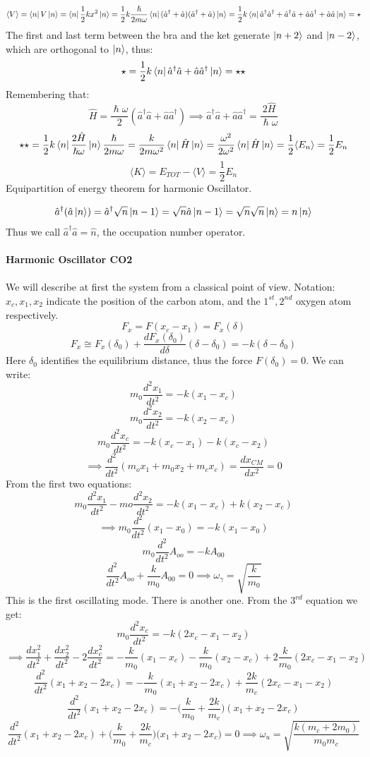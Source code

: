\documentclass{article}
\begin{document}
$$ \langle V \rangle = \bra{n}V \ket{n} = \bra{n}\frac{1}{2}kx^2 \ket{n} = \frac{1}{2} k \frac{\hslash}{2m\omega} \bra{n}(\hat{a}^{\dag} + \hat{a})(\hat{a}^{\dag}+\hat{a})\ket{n} = \frac{1}{2}k\bra{n}\hat{a}^{\dag}\hat{a}^{\dag}+ \hat{a}^{\dag}\hat{a}+\hat{a}\hat{a}^{\dag}
+\hat{a}\hat{a}\ket{n} = \star $$ 
The first and last term between the bra and the ket generate $\ket{n+2}$ and $\ket{n-2}$, which are orthogonal to $\ket{n}$, thus:
$$\star = \frac{1}{2}k\bra{n}\hat{a}^{\dag}\hat{a}+\hat{a}\hat{a}^{\dag} \ket{n} = \star \star$$
Remembering that:
$$\hat{H} = \frac{\hslash\omega}{2}(\hat{a}^{\dag}\hat{a}+\hat{a}\hat{a}^{\dag}) \implies \hat{a}^{\dag}\hat{a}+\hat{a}\hat{a}^{\dag} = \frac{2\hat{H}}{\hslash\omega} $$
$$ \star \star = \frac{1}{2} k \bra{n}\frac{2\hat{H}}{\hslash\omega}\ket{n}\frac{\hslash}{2m\omega}=\frac{k}{2m\omega^2}\bra{n}\hat{H}\ket{n}=\frac{\omega^2}{2\omega^2}\bra{n}\hat{H}\ket{n}=\frac{1}{2}\langle E_n \rangle = \frac{1}{2}E_n$$
$$\langle K \rangle = E_{TOT} -\langle V \rangle = \frac{1}{2} E_n$$
Equipartition of energy theorem for harmonic Oscillator.

$$ \hat{a}^{\dag}(\hat{a} \ket{n}) = \hat{a}^{\dag}\sqrt{n}\ket{n-1} =\sqrt{n}\hat{a}\ket{n-1}= \sqrt{n}\sqrt{n}\ket{n} = n \ket{n}$$
Thus we call $\hat{a}^{\dag}\hat{a} = \hat{n}$, the occupation  number operator.\\  \\ 
\textbf{Harmonic Oscillator CO2 }\\ \\
We will describe at first the system from a classical point of view.
Notation:$ x_c,x_1,x_2 $ indicate the position of the carbon atom, and the $ 1^{st},2^{nd} $ oxygen atom respectively.
$$F_x = F(x_c-x_1) = F_x(\delta)$$
$$F_x  \cong F_x(\delta_0)+ \frac{dF_x(\delta_0)}{d\delta}(\delta-\delta_0) = -k (\delta-\delta_0)$$
Here $\delta_0$ identifies the equilibrium distance, thus the force $F(\delta_0) = 0.$
We can write:
$$m_0 \frac{d^2x_1}{dt^2} = -k(x_1-x_c)$$
$$m_0 \frac{d^2x_2}{dt^2} = -k(x_2-x_c)$$
$$m_0 \frac{d^2x_c}{dt^2} = -k(x_c-x_1)-k(x_c-x_2)$$
$$\implies\frac{d^2}{dt^2} (m_o x_1+m_0x_2+m_c x_c) = \frac{dx_{CM}}{dx^2} = 0$$
From the first two equations:
$$m_0 \frac{d^2x_1}{dt^2}-mo \frac{d^2x_2}{dt^2} = -k(x_1-x_c)+k(x_2-x_c)$$
$$\implies m_0 \frac{d^2}{dt^2}(x_1-x_0) = -k(x_1-x_0)$$
$$ m_0 \frac{d^2}{dt^2}A_{oo} = -kA_{00}$$
$$ \frac{d^2}{dt^2}A_{oo} +\frac{k}{m_0}A_{00}=0 \implies \omega_\gamma = \sqrt{\frac{k}{m_0}}$$
This is the first oscillating mode. There is another one. From the $3^{rd}$ equation we get:
$$m_0 \frac{d^2x_c}{dt^2} = -k(2x_c-x_1-x_2)$$
$$\implies \frac{dx_1^2}{dt^2}+\frac{dx_2^2}{dt^2}-2\frac{dx_c^2}{dt^2} = -\frac{k}{m_0} (x_1-x_c)-\frac{k}{m_0} (x_2-x_c)+2\frac{k}{m_0}(2x_c-x_1-x_2)$$
$$\frac{d^2}{dt^2}(x_1+x_2-2x_c) = -\frac{k}{m_0}(x_1+x_2-2x_c)+\frac{2k}{m_c}(2x_c-x_1-x_2)$$
$$\frac{d^2}{dt^2}(x_1+x_2-2x_c) = -\biggl(\frac{k}{m_0}+\frac{2k}{m_c}\biggl)(x_1+x_2-2x_c)$$
$$\frac{d^2}{dt^2}(x_1+x_2-2x_c) + \biggl(\frac{k}{m_0}+\frac{2k}{m_c}\biggl)\biggl(x_1+x_2-2x_c\biggl) = 0 \implies\omega_u = \sqrt{\frac{k(m_c+2m_0)}{m_0m_c}}$$
\end{document}
